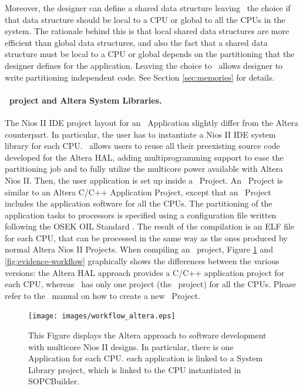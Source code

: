 Moreover, the designer can define a shared data structure leaving
\rtd\ the choice if that data structure should be local to a CPU or
global to all the CPUs in the system. The rationale behind this is
that local shared data structures are more efficient than global data
structures, and also the fact that a shared data structure must be
local to a CPU or global depends on the partitioning that the designer
defines for the application. Leaving the choice to \rtd\ allows
designer to write partitioning independent code. See Section
\ref{sec:memories} for details.

\paragraph{\rtd\ project and Altera System Libraries.}
The Nios II IDE project layout for an \ee\ Application slightly differ
from the Altera counterpart. In particular, the user has to
instantiate a Nios II IDE system library for each CPU. \ee\ allows
users to reuse all their preexisting source code developed for the
Altera HAL, adding multiprogramming support to ease the partitioning
job and to fully utilize the multicore power available with Altera
Nios II. Then, the user application is set up inside a \rtd\
Project. An \rtd\ Project is similar to an Altera C/C++ Application
Project, except that an \rtd\ Project includes the application
software for all the CPUs. The partitioning of the application tasks
to processors is specified using a configuration file written
following the OSEK OIL Standard \cite{OSEKOIL}. The result of the
compilation is an ELF file for each CPU, that can be processed in the
same way as the ones produced by normal Altera Nios II Projects. When
compiling an \rtd\ project, Figure \ref{fig:altera-workflow} and
\ref{fig:evidence-workflow} graphically shows the differences between
the various versions: the Altera HAL approach provides a C/C++
application project for each CPU, whereas \ee\ has only one project
(the \rtd\ project) for all the CPUs. Please refer to the \rtd\ manual
on how to create a new \rtd\ Project.

%
\begin{figure}
\texttt{[image: images/workflow\_altera.eps]}
\caption{\label{fig:altera-workflow}This Figure displays the Altera
approach to software development with multicore Nios II designs. In
particular, there is one Application for each CPU. each application is
linked to a System Library project, which is linked to the CPU
instantiated in SOPCBuilder.}
\end{figure}

